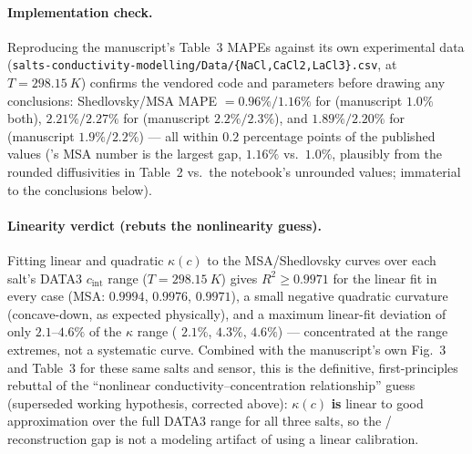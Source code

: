 \documentclass[11pt]{article}
\newcommand{\cint}{c_{\mathrm{int}}}
\begin{document}
\paragraph{Implementation check.} Reproducing the manuscript's Table~3 MAPEs
against its own experimental data
(\texttt{salts-conductivity-modelling/Data/\{NaCl,CaCl2,LaCl3\}.csv}, at
$T=\SI{298.15}{K}$) confirms the vendored code and parameters before drawing any
conclusions: Shedlovsky/MSA MAPE $=0.96\%/1.16\%$ for  (manuscript
$1.0\%$ both), $2.21\%/2.27\%$ for  (manuscript $2.2\%/2.3\%$), and
$1.89\%/2.20\%$ for  (manuscript $1.9\%/2.2\%$) --- all within
$0.2$ percentage points of the published values ('s MSA number is the
largest gap, $1.16\%$ vs.\ $1.0\%$, plausibly from the rounded diffusivities in
Table~2 vs.\ the notebook's unrounded values; immaterial to the conclusions
below).

\paragraph{Linearity verdict (rebuts the nonlinearity guess).} Fitting linear and
quadratic $\kappa(c)$ to the MSA/Shedlovsky curves over each salt's DATA3
$\cint$ range ($T=\SI{298.15}{K}$) gives $R^2\ge0.9971$ for the linear fit in
every case (MSA:  $0.9994$,  $0.9976$,  $0.9971$),
a small negative quadratic curvature (concave-down, as expected physically), and
a maximum linear-fit deviation of only $2.1$--$4.6\%$ of the $\kappa$ range
( $2.1\%$,  $4.3\%$,  $4.6\%$) --- concentrated at
the range extremes, not a systematic curve. Combined with the manuscript's own
Fig.~3 and Table~3 for these same salts and sensor, this is the definitive,
first-principles rebuttal of the ``nonlinear conductivity--concentration
relationship'' guess (superseded working hypothesis, corrected above): $\kappa(c)$
\textbf{is} linear to good approximation over the full DATA3 range for all three
salts, so the / reconstruction gap is not a modeling artifact
of using a linear calibration.
\end{document}
